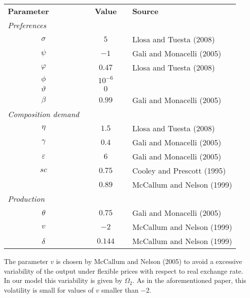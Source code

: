 \documentclass[11pt]{article}
\begin{document}
\begin{center}
\begin{tabular}{|lllll|}
\hline
\textbf{Parameter} &  & \textbf{Value} &  & \textbf{Source} \\ 
\cline{1-1}\cline{3-3}\cline{5-5}
\textit{Preferences} &  &  &  &  \\ 
\multicolumn{1}{|c}{$\sigma $} &  & \multicolumn{1}{c}{$5$} &  & Llosa and
Tuesta (2008) \\ 
\multicolumn{1}{|c}{$\psi $} &  & \multicolumn{1}{c}{$-1$} &  & Gali and
Monacelli (2005) \\ 
\multicolumn{1}{|c}{$\varphi $} &  & \multicolumn{1}{c}{$0.47$} &  & Llosa
and Tuesta (2008) \\ 
\multicolumn{1}{|c}{$\phi $} &  & \multicolumn{1}{c}{$10^{-6}$} &  &  \\ 
\multicolumn{1}{|c}{$\vartheta $} &  & \multicolumn{1}{c}{$0$} &  &  \\ 
\multicolumn{1}{|c}{$\beta $} &  & \multicolumn{1}{c}{$0.99$} &  & Gali and
Monacelli (2005) \\ 
\textit{Composition demand} &  & \multicolumn{1}{c}{} &  &  \\ 
\multicolumn{1}{|c}{$\eta $} &  & \multicolumn{1}{c}{$1.5$} &  & Llosa and
Tuesta (2008) \\ 
\multicolumn{1}{|c}{$\gamma $} &  & \multicolumn{1}{c}{$0.4$} &  & Gali and
Monacelli (2005) \\ 
\multicolumn{1}{|c}{$\varepsilon $} &  & \multicolumn{1}{c}{$6$} &  & Gali
and Monacelli (2005) \\ 
\multicolumn{1}{|c}{$sc$} &  & \multicolumn{1}{c}{$0.75$} &  & Cooley and
Prescott (1995) \\ 
&  & \multicolumn{1}{c}{$0.89$} &  & McCallum and Nelson (1999) \\ 
\textit{Production} &  & \multicolumn{1}{c}{} &  &  \\ 
\multicolumn{1}{|c}{$\theta $} &  & \multicolumn{1}{c}{$0.75$} &  & Gali and
Monacelli (2005) \\ 
\multicolumn{1}{|c}{$v$} &  & \multicolumn{1}{c}{$-2$} &  & McCallum and
Nelson (1999) \\ 
\multicolumn{1}{|c}{$\delta $} &  & \multicolumn{1}{c}{$0.144$} &  & 
McCallum and Nelson (1999) \\ \hline
\end{tabular}
\end{center}

The parameter $v$ is chosen by McCallum and Nelson (2005) to avoid a
excessive variability of the output under flexible prices with respect to
real exchange rate. In our model this variability is given by $\Omega _{2}.$
As in the aforementioned paper, this volatility is small for values of $v$
smaller than $-2.$
\end{document}
